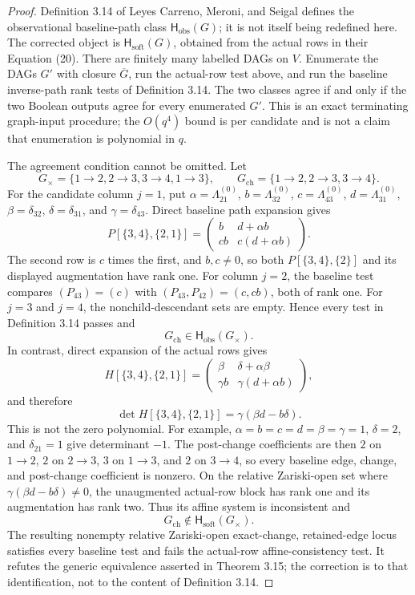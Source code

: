 \documentclass{article}
\begin{document}
\begin{proof}
Definition 3.14 of Leyes Carreno, Meroni, and Seigal defines the observational baseline-path class \(\mathsf H_{\mathrm{obs}}(G)\); it is not itself being redefined here.  The corrected object is \(\mathsf H_{\mathrm{soft}}(G)\), obtained from the actual rows in their Equation (20).  There are finitely many labelled DAGs on \(V\).  Enumerate the DAGs \(G'\) with closure \(\overline G\), run the actual-row test above, and run the baseline inverse-path rank tests of Definition 3.14.  The two classes agree if and only if the two Boolean outputs agree for every enumerated \(G'\).  This is an exact terminating graph-input procedure; the \(O(q^4)\) bound is per candidate and is not a claim that enumeration is polynomial in \(q\).

The agreement condition cannot be omitted.  Let
\[
 G_\times=\{1\to2,2\to3,3\to4,1\to3\},
 \qquad
 G_{\mathrm{ch}}=\{1\to2,2\to3,3\to4\}.
\]
For the candidate column \(j=1\), put \(\alpha=\Lambda^{(0)}_{21}\), \(b=\Lambda^{(0)}_{32}\), \(c=\Lambda^{(0)}_{43}\), \(d=\Lambda^{(0)}_{31}\), \(\beta=\delta_{32}\), \(\delta=\delta_{31}\), and \(\gamma=\delta_{43}\).  Direct baseline path expansion gives
\[
 P[\{3,4\},\{2,1\}]
 =\begin{pmatrix}
 b&d+\alpha b\\
 cb&c(d+\alpha b)
 \end{pmatrix}.
\]
The second row is \(c\) times the first, and \(b,c\ne0\), so both \(P[\{3,4\},\{2\}]\) and its displayed augmentation have rank one.  For column \(j=2\), the baseline test compares \((P_{43})=(c)\) with \((P_{43},P_{42})=(c,cb)\), both of rank one.  For \(j=3\) and \(j=4\), the nonchild-descendant sets are empty.  Hence every test in Definition 3.14 passes and
\[
 G_{\mathrm{ch}}\in\mathsf H_{\mathrm{obs}}(G_\times).
\]
In contrast, direct expansion of the actual rows gives
\[
 H[\{3,4\},\{2,1\}]
 =\begin{pmatrix}
 \beta&\delta+\alpha\beta\\
 \gamma b&\gamma(d+\alpha b)
 \end{pmatrix},
\]
and therefore
\[
 \det H[\{3,4\},\{2,1\}]
 =\gamma(\beta d-b\delta).
\]
This is not the zero polynomial.  For example, \(\alpha=b=c=d=\beta=\gamma=1\), \(\delta=2\), and \(\delta_{21}=1\) give determinant \(-1\).  The post-change coefficients are then \(2\) on \(1\to2\), \(2\) on \(2\to3\), \(3\) on \(1\to3\), and \(2\) on \(3\to4\), so every baseline edge, change, and post-change coefficient is nonzero.  On the relative Zariski-open set where \(\gamma(\beta d-b\delta)\ne0\), the unaugmented actual-row block has rank one and its augmentation has rank two.  Thus its affine system is inconsistent and
\[
 G_{\mathrm{ch}}\notin\mathsf H_{\mathrm{soft}}(G_\times).
\]
The resulting nonempty relative Zariski-open exact-change, retained-edge locus satisfies every baseline test and fails the actual-row affine-consistency test.  It refutes the generic equivalence asserted in Theorem 3.15; the correction is to that identification, not to the content of Definition 3.14.


\end{proof}
\end{document}
